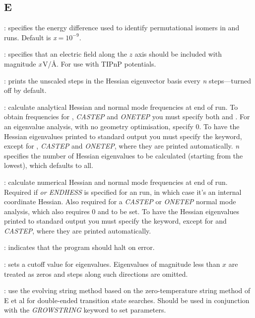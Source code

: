 {{\subsection{E}
: specifies the energy difference used to identify permutational isomers
in  and  runs. Default is {\it x}$=10^{-9}$.

: specifies that an electric field along the $z$ axis
should be included with magnitude {\it x}\,V/\AA. For use with TIPnP potentials.

: prints the unscaled steps in the Hessian
eigenvector basis every {\it n\/} steps---turned off by default.

: calculate analytical Hessian and normal mode
frequencies at end of run. To obtain frequencies for {},
{\it CASTEP\/} and {\it ONETEP} you must
specify both {} and {}.
For an eigenvalue analysis, with no geometry optimisation, specify { 0\/}.
To have the Hessian eigenvalues printed to standard output you must specify the 
{} keyword, except for {}, {\it CASTEP\/} and {\it ONETEP\/}, where they are printed
automatically. {\it n\/} specifies the number of Hessian eigenvalues to be calculated 
(starting from the lowest), which defaults to all.

: calculate numerical Hessian and normal mode
frequencies at end of run.
Required if {} {\it or ENDHESS\/} is specified for an {} run,
in which case it's an internal coordinate Hessian.
Also required for a {\it CASTEP\/} or {\it ONETEP} normal mode analysis, which
also requires { 0\/} and {} to be set.
To have the Hessian eigenvalues printed to standard output you must specify the 
{} keyword, except for {} and {\it CASTEP\/}, where they are printed
automatically. 

: indicates that the program should halt on error.

: sets a cutoff value for eigenvalues. Eigenvalues
of magnitude less than $x$ are treated as zeros and steps along such directions
are omitted.

: use the evolving string method based on the
  zero-temperature string method of E et al \cite{ERV02} for double-ended
  transition state searches. Should be used in conjunction with the {\it %
  GROWSTRING} keyword to set parameters. 

}}
